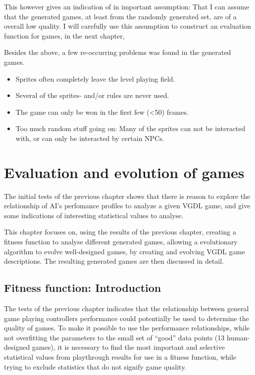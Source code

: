 \documentclass[a4paper,titlepage,final]{report}
\begin{document}
This however gives an indication of in important assumption: That I can assume that the generated games, at least from the randomly generated set, are of a overall low quality.
I will carefully use this assumption to construct an evaluation function for games, in the next chapter,

Besides the above, a few re-occurring problems was found in the generated games.

\begin{itemize}
\item Sprites often completely leave the level playing field.
\item Several of the sprites- and/or rules are never used.
\item The game can only be won in the first few (<50) frames.
\item Too much random stuff going on: Many of the sprites can not be interacted with, or can only be interacted by certain NPCs.
\end{itemize}





\chapter{Evaluation and evolution of games}
\label{ch_task2}

The initial tests of the previous chapter shows that there is reason to explore the relationship of AI's perfomance profiles to analyze a given VGDL game, and give some indications of interesting statistical values to analyse.

This chapter focuses on, using the results of the previous chapter, creating a fitness function to analyse different generated games, allowing a evolutionary algorithm to evolve well-designed games, by creating and evolving VGDL game descriptions.
The resulting generated games are then discussed in detail.

\section{Fitness function: Introduction}
\label{sec_task2intro}
The tests of the previous chapter indicates that the relationship between general game playing controllers performance could potentially be used to determine the quality of games. 
To make it possible to use the performance relationships, while not overfitting the parameters to the small set of ``good'' data points (13 human-designed games), it is necessary to find the most important and selective statistical values from playthrough results for use in a fitness function, while trying to exclude statistics that do not signify game quality.
\end{document}
